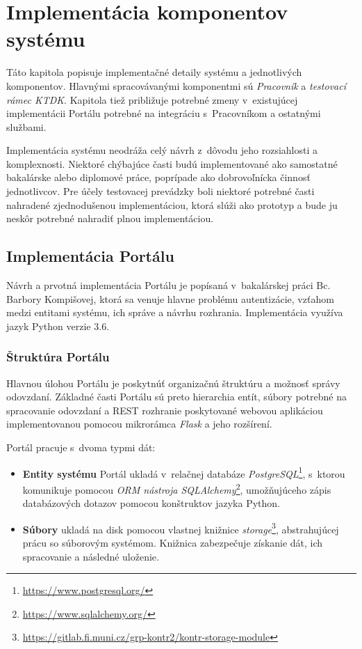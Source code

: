 \documentclass[
  digital, %
  oneside, %
  table,   %
  lof,     %
  lot,   %
]{fithesis3}
\newcommand*{\footurl}[1]{\footnote{\url{#1}}}
\begin{document}
\chapter{Implementácia komponentov systému}

Táto kapitola popisuje implementačné detaily systému a jednotlivých komponentov. Hlavnými spracovávanými komponentmi sú \emph{Pracovník} a \emph{testovací rámec KTDK}. Kapitola tiež približuje potrebné zmeny v~existujúcej implementácii Portálu potrebné na integráciu s~Pracovníkom a ostatnými službami.

Implementácia systému neodráža celý návrh z~dôvodu jeho rozsiahlosti a komplexnosti. Niektoré chýbajúce časti budú implementované ako samostatné bakalárske alebo diplomové práce, poprípade ako dobrovoľnícka činnosť jednotlivcov. Pre účely testovacej prevádzky boli niektoré potrebné časti nahradené zjednodušenou implementáciou, ktorá slúži ako prototyp a bude ju neskôr potrebné nahradiť plnou implementáciou.


\section{Implementácia Portálu}
\label{impl-portal}

Návrh a prvotná implementácia Portálu je popísaná v~bakalárskej práci Bc. Barbory Kompišovej, ktorá sa venuje hlavne problému autentizácie, vzťahom medzi entitami systému, ich správe a návrhu rozhrania\cite{kontr-portal}. Implementácia využíva jazyk Python verzie 3.6. 

\subsection{Štruktúra Portálu}

Hlavnou úlohou Portálu je poskytnúť organizačnú štruktúru a možnosť správy odovzdaní. Základné časti Portálu sú preto hierarchia entít, súbory potrebné na spracovanie odovzdaní a REST rozhranie poskytované webovou aplikáciou implementovanou pomocou mikrorámca \emph{Flask} a jeho rozšírení. 

Portál pracuje s~dvoma typmi dát:
\begin{itemize}
  \item \textbf{Entity systému} Portál ukladá v~relačnej databáze \emph{PostgreSQL}\footnote{\url{https://www.postgresql.org/}}, s~ktorou komunikuje pomocou \emph{ORM nástroja SQLAlchemy}\footurl{https://www.sqlalchemy.org/}, umožňujúceho zápis databázových dotazov pomocou konštruktov jazyka Python.
  \item \textbf{Súbory} ukladá na disk pomocou vlastnej knižnice \emph{storage}\footurl{https://gitlab.fi.muni.cz/grp-kontr2/kontr-storage-module}, abstrahujúcej prácu so súborovým systémom. Knižnica zabezpečuje získanie dát, ich spracovanie a následné uloženie.
\end{itemize}
\end{document}
